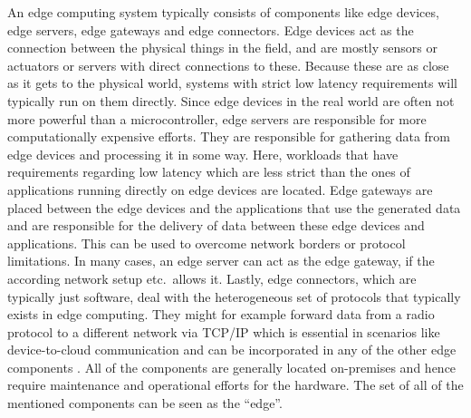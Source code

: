         An edge computing system typically consists of components like edge devices, edge servers, edge gateways and edge connectors. Edge devices act as the connection between the physical things in the field, and are mostly sensors or actuators or servers with direct connections to these. Because these are as close as it gets to the physical world, systems with strict low latency requirements will typically run on them directly. Since edge devices in the real world are often not more powerful than a microcontroller, edge servers are responsible for more computationally expensive efforts. They are responsible for gathering data from edge devices and processing it in some way. Here, workloads that have requirements regarding low latency which are less strict than the ones of applications running directly on edge devices are located. Edge gateways are placed between the edge devices and the applications that use the generated data and are responsible for the delivery of data between these edge devices and applications. This can be used to overcome network borders or protocol limitations. In many cases, an edge server can act as the edge gateway, if the according network setup etc.\ allows it. Lastly, edge connectors, which are typically just software, deal with the heterogeneous set of protocols that typically exists in edge computing. They might for example forward data from a radio protocol to a different network via TCP/IP which is essential in scenarios like device-to-cloud communication and can be incorporated in any of the other edge components \cite{atos_2021_2021}. All of the components are generally located on-premises and hence require maintenance and operational efforts for the hardware. The set of all of the mentioned components can be seen as the ``edge''.
            
